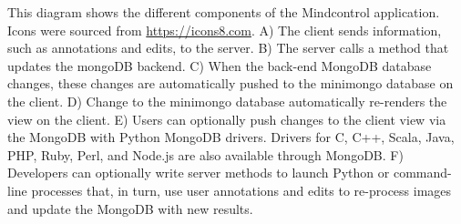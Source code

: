 \label{fig:appstructure}

This diagram shows the different components of the Mindcontrol application. Icons were sourced from \href{https://icons8.com}{https://icons8.com}. A) The client sends information, such as annotations and edits, to the server. B) The server calls a method that updates the mongoDB backend. C) When the back-end MongoDB database changes, these changes are automatically pushed to the minimongo database on the client. D) Change to the minimongo database automatically re-renders the view on the client. E) Users can optionally push changes to the client view via the MongoDB with Python MongoDB drivers. Drivers for C, C++, Scala, Java, PHP, Ruby, Perl, and Node.js are also available through MongoDB. F) Developers can optionally write server methods to launch Python or command-line processes that, in turn, use user annotations and edits to re-process images and update the MongoDB with new results. 